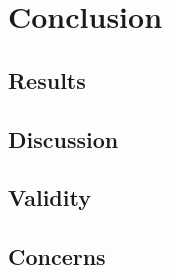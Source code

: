 \chapter{Conclusion}
\label{ch:conclusion}

\section{Results}

\section{Discussion}

\section{Validity}

\section{Concerns}
